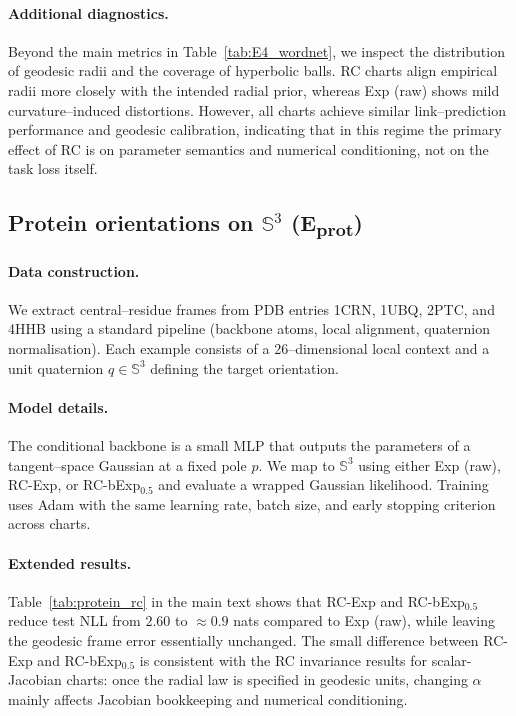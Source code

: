 \documentclass{article}
\theoremstyle{definition}
\theoremstyle{remark}
\newcommand{\SSS}{\mathbb{S}}
\begin{document}
\paragraph{Additional diagnostics.}
Beyond the main metrics in Table~\ref{tab:E4_wordnet}, we inspect the distribution of geodesic
radii and the coverage of hyperbolic balls.
RC charts align empirical radii more closely with the intended radial prior, whereas Exp (raw)
shows mild curvature--induced distortions.
However, all charts achieve similar link--prediction performance and geodesic calibration,
indicating that in this regime the primary effect of RC is on parameter semantics and numerical
conditioning, not on the task loss itself.

\subsection*{Protein orientations on $\SSS^3$ (E\textsubscript{prot})}
\label{app:E_protein_details}

\paragraph{Data construction.}
We extract central--residue frames from PDB entries 1CRN, 1UBQ, 2PTC, and 4HHB using a
standard pipeline (backbone atoms, local alignment, quaternion normalisation).
Each example consists of a 26--dimensional local context and a unit quaternion
$q \in \SSS^3$ defining the target orientation.

\paragraph{Model details.}
The conditional backbone is a small MLP that outputs the parameters of a tangent--space
Gaussian at a fixed pole $p$.
We map to $\SSS^3$ using either Exp (raw), RC-Exp, or RC-bExp$_{0.5}$ and evaluate a wrapped
Gaussian likelihood.
Training uses Adam with the same learning rate, batch size, and early stopping criterion across
charts.

\paragraph{Extended results.}
Table~\ref{tab:protein_rc} in the main text shows that RC-Exp and RC-bExp$_{0.5}$ reduce
test NLL from $2.60$ to $\approx 0.9$ nats compared to Exp (raw), while leaving the geodesic
frame error essentially unchanged.
The small difference between RC-Exp and RC-bExp$_{0.5}$ is consistent with the RC
invariance results for scalar-Jacobian charts: once the radial law is specified in geodesic units,
changing $\alpha$ mainly affects Jacobian bookkeeping and numerical conditioning.
\end{document}
